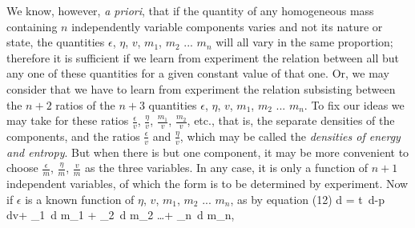 \documentclass[12pt]{memoir}
\begin{document}
We know, however, \textit{a priori}, that if the quantity of any homogeneous mass containing $n$ independently variable components varies and not its nature or state, the quantities $\epsilon$, $\eta$, $v$, $m_1$, $m_2$ ... $m_n$ will all vary in the same proportion; therefore it is sufficient if we learn from experiment the relation between all but any one of these quantities for a given constant value of that one.  Or, we may consider that we have to learn from experiment the relation subsisting between the $n +2$ ratios of the $n+3$ quantities $\epsilon$, $\eta$, $v$, $m_1$, $m_2$ ... $m_n$.
To fix our ideas we may take for these ratios $\frac{\epsilon}{v}$, $\frac{\eta}{v}$, $\frac{m_1}{v}$, $\frac{m_2}{v}$, etc., that is, the separate densities of the components, and the ratios $\frac{\epsilon}{v}$ and $\frac{\eta}{v}$, which may be called the \textit{densities of energy and entropy}. But when there is but one component, it may be more convenient to choose $\frac{\epsilon}{m}$, $\frac{\eta}{m}$, $\frac{v}{m}$ as the three variables. In any case, it is only a function of $n+ 1$ independent variables, of which the form is to be determined by experiment.
Now if $\epsilon$ is a known function of $\eta$, $v$, $m_1$, $m_2$ ... $m_n$, as by equation (12)
\eqs d \epsilon = t \,d\eta-p \,dv+ \mu_1 \,d m_1 + \mu_2 \,d m_2 \dots + \mu_n \,d m_n,    \label{86}\eqe
\end{document}
